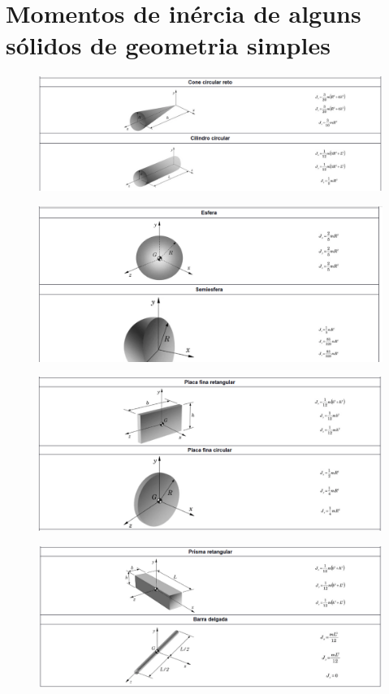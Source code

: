 \documentclass[a4paper, 12pt]{article}
\begin{document}
\section{Momentos de inércia de alguns sólidos de geometria simples}
	\begin{figure}[h]
		\center
		\includegraphics[scale=0.7]{imagens/b2.png} 
	\end{figure}
	\begin{figure}[h]
		\center
		\includegraphics[scale=0.7]{imagens/b3.png} 
	\end{figure}
	\begin{figure}[h]
		\center
		\includegraphics[scale=0.7]{imagens/b4.png} 
	\end{figure}
	\begin{figure}[h]
		\center
		\includegraphics[scale=0.7]{imagens/b5.png} 
	\end{figure}
\end{document}
